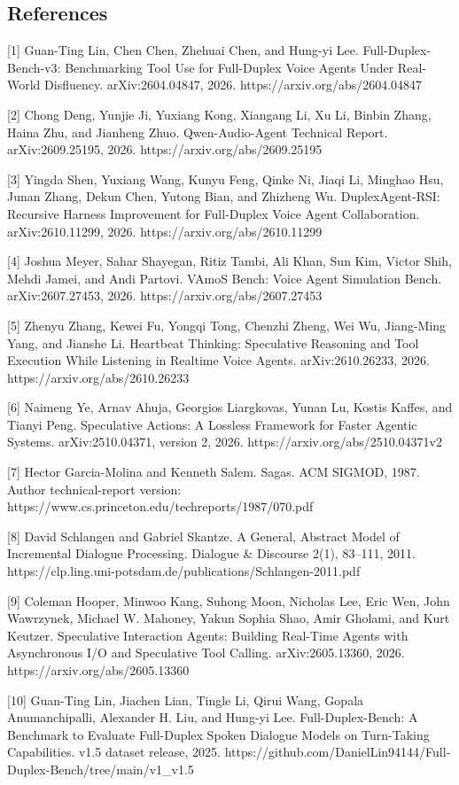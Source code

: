 \documentclass[10pt]{article}
\begin{document}
\begin{singlespace}\small\section*{References}

[1] Guan-Ting Lin, Chen Chen, Zhehuai Chen, and Hung-yi Lee. Full-Duplex-Bench-v3: Benchmarking Tool Use for Full-Duplex Voice Agents Under Real-World Disfluency. arXiv:2604.04847, 2026. https://arxiv.org/abs/2604.04847


[2] Chong Deng, Yunjie Ji, Yuxiang Kong, Xiangang Li, Xu Li, Binbin Zhang, Haina Zhu, and Jianheng Zhuo. Qwen-Audio-Agent Technical Report. arXiv:2609.25195, 2026. https://arxiv.org/abs/2609.25195


[3] Yingda Shen, Yuxiang Wang, Kunyu Feng, Qinke Ni, Jiaqi Li, Minghao Hsu, Junan Zhang, Dekun Chen, Yutong Bian, and Zhizheng Wu. DuplexAgent-RSI: Recursive Harness Improvement for Full-Duplex Voice Agent Collaboration. arXiv:2610.11299, 2026. https://arxiv.org/abs/2610.11299


[4] Joshua Meyer, Sahar Shayegan, Ritiz Tambi, Ali Khan, Sun Kim, Victor Shih, Mehdi Jamei, and Andi Partovi. VAmoS Bench: Voice Agent Simulation Bench. arXiv:2607.27453, 2026. https://arxiv.org/abs/2607.27453


[5] Zhenyu Zhang, Kewei Fu, Yongqi Tong, Chenzhi Zheng, Wei Wu, Jiang-Ming Yang, and Jianshe Li. Heartbeat Thinking: Speculative Reasoning and Tool Execution While Listening in Realtime Voice Agents. arXiv:2610.26233, 2026. https://arxiv.org/abs/2610.26233


[6] Naimeng Ye, Arnav Ahuja, Georgios Liargkovas, Yunan Lu, Kostis Kaffes, and Tianyi Peng. Speculative Actions: A Lossless Framework for Faster Agentic Systems. arXiv:2510.04371, version 2, 2026. https://arxiv.org/abs/2510.04371v2


[7] Hector Garcia-Molina and Kenneth Salem. Sagas. ACM SIGMOD, 1987. Author technical-report version: https://www.cs.princeton.edu/techreports/1987/070.pdf


[8] David Schlangen and Gabriel Skantze. A General, Abstract Model of Incremental Dialogue Processing. Dialogue \& Discourse 2(1), 83--111, 2011. https://clp.ling.uni-potsdam.de/publications/Schlangen-2011.pdf


[9] Coleman Hooper, Minwoo Kang, Suhong Moon, Nicholas Lee, Eric Wen, John Wawrzynek, Michael W. Mahoney, Yakun Sophia Shao, Amir Gholami, and Kurt Keutzer. Speculative Interaction Agents: Building Real-Time Agents with Asynchronous I/O and Speculative Tool Calling. arXiv:2605.13360, 2026. https://arxiv.org/abs/2605.13360


[10] Guan-Ting Lin, Jiachen Lian, Tingle Li, Qirui Wang, Gopala Anumanchipalli, Alexander H. Liu, and Hung-yi Lee. Full-Duplex-Bench: A Benchmark to Evaluate Full-Duplex Spoken Dialogue Models on Turn-Taking Capabilities. v1.5 dataset release, 2025. https://github.com/DanielLin94144/Full-Duplex-Bench/tree/main/v1\_v1.5

\end{singlespace}
\end{document}
